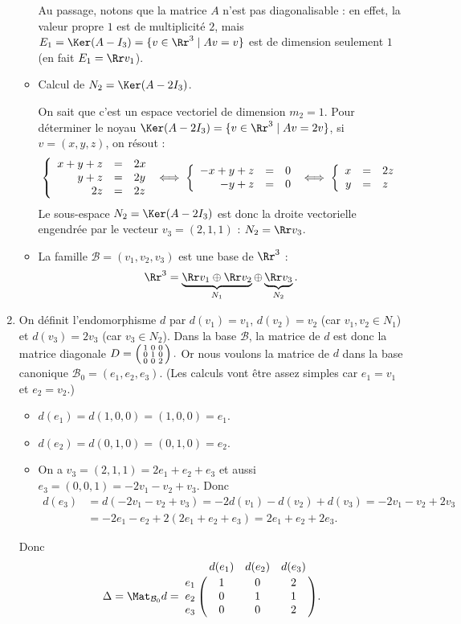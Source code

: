 \documentclass[12pt, class=report,crop=false]{standalone}
\begin{document}
\begin{exemple}
\begin{enumerate}
\begin{itemize}
Au passage, notons que la matrice $A$ n'est pas diagonalisable : en effet,
la valeur propre $1$ est de multiplicité $2$, mais 
$E_1 = \Ker(A-I_3) =\{v \in \Rr^3 \mid Av=v\}$ est de dimension seulement $1$ (en fait
$E_1 = \Rr v_1$).

    \item Calcul de $N_2 = \Ker(A-2I_3)$.
    
    On sait que c'est un espace vectoriel de dimension $m_2=1$.
    Pour déterminer le noyau $\Ker(A-2I_3)=\{v\in \Rr^3 \mid Av=2v\}$, si $v=(x,y,z)$, on résout :
$$\left\{\begin{array}{rcl}
x+y+z&=& 2x\cr
y+z&=&2y\cr
2z&=&2z
\end{array}\right.\iff\left\{\begin{array}{rcl}
-x+y+z&=&0\cr
-y+z&=&0
\end{array}\right.\iff\left\{\begin{array}{rcl}
x&=&2z\cr
y&=& z
\end{array}\right.$$
Le sous-espace $N_2=\Ker(A-2I_3)$ est donc la droite vectorielle engendrée par le vecteur $v_3=(2,1,1)$ :
$N_2 = \Rr v_3$.


    
    \item La famille $\mathcal{B} = (v_1,v_2,v_3)$ est une base de $\Rr^3$ :
    $$\Rr^3 = \underbrace{\Rr v_1 \oplus \Rr v_2}_{N_1} \oplus \underbrace{\Rr v_3}_{N_2}.$$
  
  \end{itemize}

  \item 
  On définit l'endomorphisme $d$  par $d(v_1)=v_1$, $d(v_2)= v_2$ (car $v_1,v_2 \in N_1$)
  et $d(v_3) = 2v_3$ (car $v_3 \in N_2$).
  Dans la base $\mathcal{B}$, la matrice de $d$ est donc la matrice diagonale
  $D = \left(\begin{smallmatrix}1&0&0\cr 0&1&0\cr 0&0&2\end{smallmatrix}\right).$
  Or nous voulons la matrice de $d$ dans la base canonique $\mathcal{B}_0 
  = (e_1,e_2,e_3)$. (Les calculs vont être assez simples car $e_1=v_1$ et $e_2=v_2$.)
  
  \begin{itemize}
    \item $d(e_1) = d(1,0,0) = (1,0,0) = e_1$.
    \item $d(e_2) = d(0,1,0) = (0,1,0) = e_2$.
    \item On a $v_3 = (2,1,1) = 2e_1+e_2+e_3$ et aussi $e_3 = (0,0,1) = -2v_1-v_2+v_3$.
    Donc 
    \begin{align*}
    d(e_3) &= d(-2v_1-v_2+v_3) 
    = -2d(v_1)-d(v_2) +d(v_3)
    = -2v_1-v_2+2v_3 \\
    &= -2e_1-e_2+2(2e_1+e_2+e_3)
    = 2e_1 + e_2 + 2e_3.
    \end{align*}
  \end{itemize}
    Donc
    $$\Delta = \Mat_{\mathcal{B}_0} d = 
    \bordermatrix{
       &d(e_1)&d(e_2)&d(e_3)\cr
    e_1&1&0&2\cr 
    e_2&0&1&1\cr 
    e_3&0&0&2
    }
    .$$
    

\end{enumerate}
\end{exemple}
\end{document}
